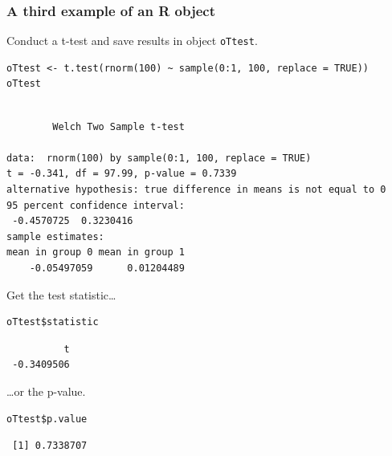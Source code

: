 \documentclass[bigger]{beamer}
\begin{document}
\begin{frame}[fragile,shrink = 20]
\frametitle{A third example of an R object}
\label{sec-1-2-5}

    Conduct a t-test and save results in object \texttt{oTtest}.


\lstset{language=R}
\begin{lstlisting}
oTtest <- t.test(rnorm(100) ~ sample(0:1, 100, replace = TRUE))
oTtest
\end{lstlisting}



\begin{verbatim}

        Welch Two Sample t-test

data:  rnorm(100) by sample(0:1, 100, replace = TRUE) 
t = -0.341, df = 97.99, p-value = 0.7339
alternative hypothesis: true difference in means is not equal to 0 
95 percent confidence interval:
 -0.4570725  0.3230416 
sample estimates:
mean in group 0 mean in group 1 
    -0.05497059      0.01204489
\end{verbatim}


Get the test statistic\ldots


\lstset{language=R}
\begin{lstlisting}
oTtest$statistic
\end{lstlisting}

\begin{verbatim}
          t 
 -0.3409506
\end{verbatim}

\ldots or the p-value.


\lstset{language=R}
\begin{lstlisting}
oTtest$p.value
\end{lstlisting}

\begin{verbatim}
 [1] 0.7338707
\end{verbatim}
\end{frame}
\end{document}
